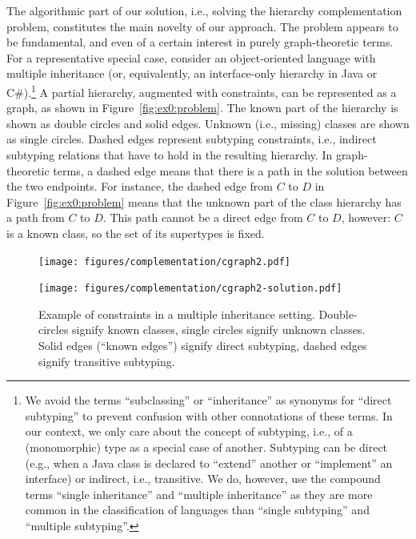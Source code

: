 
The algorithmic part of our solution, i.e., solving the hierarchy
complementation problem, constitutes the main novelty of our
approach. The problem appears to be fundamental, and even of a certain
interest in purely graph-theoretic terms. For a representative special
case, consider an object-oriented language with multiple inheritance
(or, equivalently, an interface-only hierarchy in Java or
C\#).\footnote{We avoid the terms ``subclassing'' or ``inheritance''
as synonyms for ``direct subtyping'' to prevent confusion with other
connotations of these terms. In our context, we only care about the
concept of subtyping, i.e., of a (monomorphic) type as a special case
of another. Subtyping can be direct (e.g., when a Java class is
declared to ``extend'' another or ``implement'' an interface) or
indirect, i.e., transitive. We do, however, use the compound terms
``single inheritance'' and ``multiple inheritance'' as they are more
common in the classification of languages than ``single subtyping''
and ``multiple subtyping''.}  A partial hierarchy, augmented with
constraints, can be represented as a graph, as shown in
Figure~\ref{fig:ex0:problem}. The known part of the hierarchy is shown
as double circles and solid edges. Unknown (i.e., missing) classes are
shown as single circles. Dashed edges represent subtyping constraints,
i.e., indirect subtyping relations that have to hold in the resulting
hierarchy. In graph-theoretic terms, a dashed edge means that there is
a path in the solution between the two endpoints. For instance, the
dashed edge from $C$ to $D$ in Figure~\ref{fig:ex0:problem} means that
the unknown part of the class hierarchy has a path from $C$ to
$D$. This path cannot be a direct edge from $C$ to $D$, however: $C$
is a known class, so the set of its supertypes is fixed.

\begin{figure}[t]
  \begin{minipage}[b]{.5\linewidth}
    \centering
    \texttt{[image: figures/complementation/cgraph2.pdf]}
    \label{fig:ex0:problem}
  \end{minipage}
  \begin{minipage}[b]{.5\linewidth}
    \centering
    \texttt{[image: figures/complementation/cgraph2-solution.pdf]}
    \label{fig:ex0:solution}
  \end{minipage}
  \caption[Example of constraints in a multiple inheritance setting]{%
    Example of constraints in a multiple inheritance
    setting. Double-circles signify known classes, single circles
    signify unknown classes. Solid edges (``known edges'') signify
    direct subtyping, dashed edges signify transitive subtyping.}
  \label{fig:ex0}
\end{figure}

